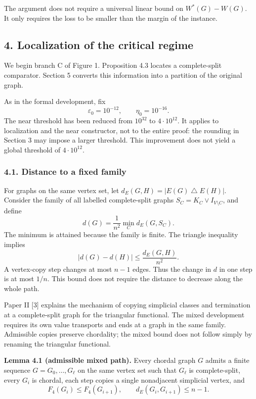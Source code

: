 \documentclass[english,11pt,a4paper]{article}
\begin{document}
The argument does not require a universal linear bound on \(W^*(G)-W(G)\). It only requires the loss to be smaller than the margin of the instance.

\subsection{4. Localization of the critical regime}\label{localization-of-the-critical-regime}

We begin branch C of Figure 1. Proposition 4.3 locates a complete-split comparator. Section 5 converts this information into a partition of the original graph.

As in the formal development, fix \[
\varepsilon_0=10^{-12},\qquad \eta_0=10^{-16}.
\tag{4.1}
\] The near threshold has been reduced from \(10^{32}\) to \(4\cdot10^{12}\). It applies to localization and the near constructor, not to the entire proof: the rounding in Section 3 may impose a larger threshold. This improvement does not yield a global threshold of \(4\cdot10^{12}\).

\subsubsection{4.1. Distance to a fixed family}\label{distance-to-a-fixed-family}

For graphs on the same vertex set, let \(d_E(G,H)=|E(G)\mathbin{\triangle}E(H)|\). Consider the family of all labelled complete-split graphs \(S_C=K_C\vee I_{V\setminus C}\), and define \[
d(G)=\frac1{n^2}\min_C d_E(G,S_C).
\] The minimum is attained because the family is finite. The triangle inequality implies \[
|d(G)-d(H)|\le\frac{d_E(G,H)}{n^2}.
\tag{4.2}
\] A vertex-copy step changes at most \(n-1\) edges. Thus the change in \(d\) in one step is at most \(1/n\). This bound does not require the distance to decrease along the whole path.

Paper II {[}3{]} explains the mechanism of copying simplicial classes and termination at a complete-split graph for the triangular functional. The mixed development requires its own value transports and ends at a graph in the same family. Admissible copies preserve chordality; the mixed bound does not follow simply by renaming the triangular functional.


\textbf{Lemma 4.1 (admissible mixed path).} Every chordal graph \(G\) admits a finite sequence \(G=G_0,\ldots,G_\ell\) on the same vertex set such that \(G_\ell\) is complete-split, every \(G_i\) is chordal, each step copies a single nonadjacent simplicial vertex, and \[
F_4(G_i)\le F_4(G_{i+1}),\qquad
d_E(G_i,G_{i+1})\le n-1.
\tag{4.3}
\]
\end{document}
